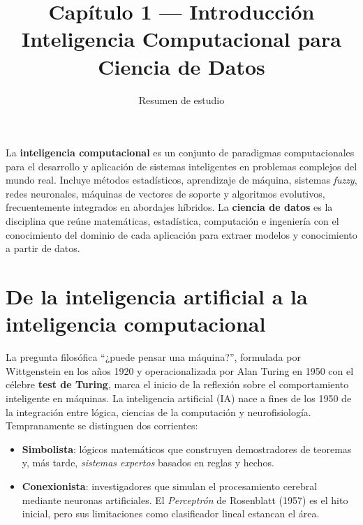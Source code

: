 

\title{\sffamily\bfseries Capítulo 1 — Introducción\\
       \large Inteligencia Computacional para Ciencia de Datos}
\author{Resumen de estudio}
\date{}


\maketitle
\thispagestyle{fancy}

\begin{conceito}
La \textbf{inteligencia computacional} es un conjunto de paradigmas
computacionales para el desarrollo y aplicación de sistemas inteligentes
en problemas complejos del mundo real. Incluye métodos estadísticos,
aprendizaje de máquina, sistemas \emph{fuzzy}, redes neuronales, máquinas
de vectores de soporte y algoritmos evolutivos, frecuentemente integrados
en abordajes híbridos. La \textbf{ciencia de datos} es la disciplina que
reúne matemáticas, estadística, computación e ingeniería con el
conocimiento del dominio de cada aplicación para extraer modelos y
conocimiento a partir de datos.
\end{conceito}

\section{De la inteligencia artificial a la inteligencia computacional}

La pregunta filosófica ``¿puede pensar una máquina?'', formulada por
Wittgenstein en los años 1920 y operacionalizada por Alan Turing en 1950
con el célebre \textbf{test de Turing}, marca el inicio de la reflexión
sobre el comportamiento inteligente en máquinas. La inteligencia
artificial (IA) nace a fines de los 1950 de la integración entre lógica,
ciencias de la computación y neurofisiología. Tempranamente se distinguen
dos corrientes:

\begin{itemize}[leftmargin=1.2cm]
  \item \textbf{Simbolista}: lógicos matemáticos que construyen
        demostradores de teoremas y, más tarde, \emph{sistemas expertos}
        basados en reglas y hechos.
  \item \textbf{Conexionista}: investigadores que simulan el procesamiento
        cerebral mediante neuronas artificiales. El \emph{Perceptrón} de
        Rosenblatt (1957) es el hito inicial, pero sus limitaciones como
        clasificador lineal estancan el área.
\end{itemize}

